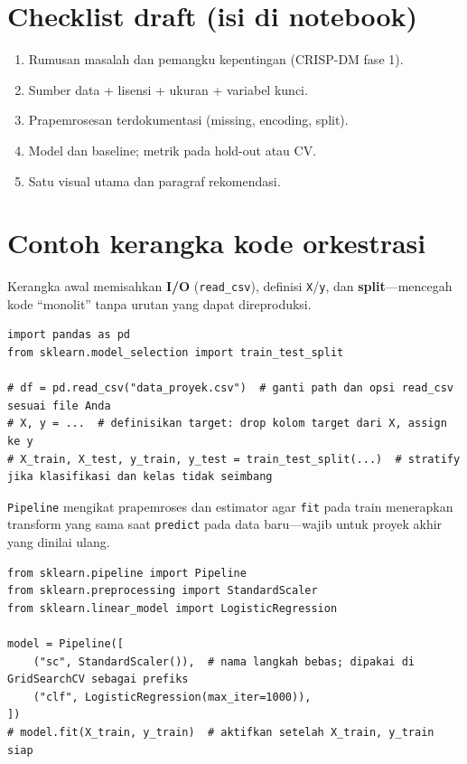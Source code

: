 \documentclass[../main.tex]{subfiles}
\begin{document}
\section{Checklist draft (isi di notebook)}

\begin{enumerate}[leftmargin=*]
  \item Rumusan masalah dan pemangku kepentingan (CRISP-DM fase 1).
  \item Sumber data + lisensi + ukuran + variabel kunci.
  \item Prapemrosesan terdokumentasi (missing, encoding, split).
  \item Model dan baseline; metrik pada hold-out atau CV.
  \item Satu visual utama dan paragraf rekomendasi.
\end{enumerate}

\section{Contoh kerangka kode orkestrasi}

\MulaiPenjelasanKode Kerangka awal memisahkan \textbf{I/O} (\texttt{read\_csv}), definisi \texttt{X}/\texttt{y}, dan \textbf{split}---mencegah kode ``monolit'' tanpa urutan yang dapat direproduksi. \SelesaiPenjelasanKode

\begin{lstlisting}[caption=Kerangka import dan split proyek]
import pandas as pd
from sklearn.model_selection import train_test_split

# df = pd.read_csv("data_proyek.csv")  # ganti path dan opsi read_csv sesuai file Anda
# X, y = ...  # definisikan target: drop kolom target dari X, assign ke y
# X_train, X_test, y_train, y_test = train_test_split(...)  # stratify jika klasifikasi dan kelas tidak seimbang
\end{lstlisting}

\MulaiPenjelasanKode \texttt{Pipeline} mengikat prapemroses dan estimator agar \texttt{fit} pada train menerapkan transform yang sama saat \texttt{predict} pada data baru---wajib untuk proyek akhir yang dinilai ulang. \SelesaiPenjelasanKode

\begin{lstlisting}[caption=Pipeline disarankan]
from sklearn.pipeline import Pipeline
from sklearn.preprocessing import StandardScaler
from sklearn.linear_model import LogisticRegression

model = Pipeline([
    ("sc", StandardScaler()),  # nama langkah bebas; dipakai di GridSearchCV sebagai prefiks
    ("clf", LogisticRegression(max_iter=1000)),
])
# model.fit(X_train, y_train)  # aktifkan setelah X_train, y_train siap
\end{lstlisting}
\end{document}
